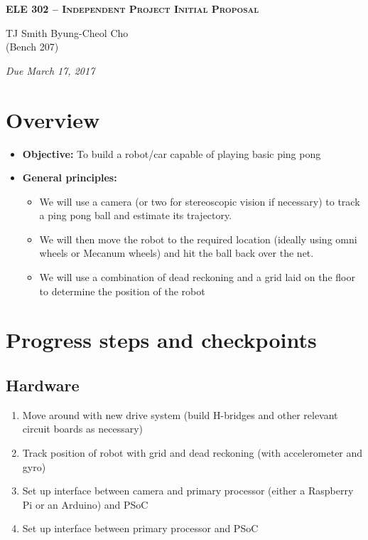 \documentclass[letterpaper, 11pt]{article}
\begin{document}
    \begin{center}
        \large
        \textsc{\textbf{ELE 302 -- Independent Project Initial Proposal}} \vspace{5pt}

        \normalsize
        TJ Smith \hspace{1cm} Byung-Cheol Cho \\
        (Bench 207) \vspace{5pt}

        \emph{Due March 17, 2017}
        \normalsize
    \end{center}

\section{Overview}
\begin{itemize}
    \item \textbf{Objective:} To build a robot/car capable of playing basic ping pong
    \item \textbf{General principles:}
        \begin{itemize}
            \item We will use a camera (or two for stereoscopic vision if necessary) to track a ping pong ball and estimate its trajectory.
            \item We will then move the robot to the required location (ideally using omni wheels or Mecanum wheels) and hit the ball back over the net.
            \item We will use a combination of dead reckoning and a grid laid on the floor to determine the position of the robot
        \end{itemize}
\end{itemize}

\section{Progress steps and checkpoints}
\subsection*{Hardware}
\begin{enumerate}[label=\textbf{(\arabic*)}]
    \item Move around with new drive system (build H-bridges and other relevant circuit boards as necessary)
    \item Track position of robot with grid and dead reckoning (with accelerometer and gyro)
    \item Set up interface between camera and primary processor (either a Raspberry Pi or an Arduino) and PSoC
    \item Set up interface between primary processor and PSoC
\end{enumerate}
\end{document}
